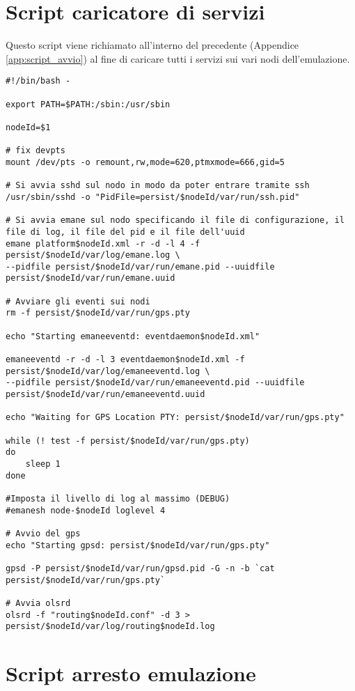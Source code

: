 \section{Script caricatore di servizi}
\label{app:script_richiamato}

Questo script viene richiamato all'interno del precedente (Appendice \ref{app:script_avvio}) al fine di caricare tutti i servizi sui vari nodi dell'emulazione. \\

\lstset{language=BASH}
\begin{lstlisting}
#!/bin/bash -

export PATH=$PATH:/sbin:/usr/sbin

nodeId=$1

# fix devpts
mount /dev/pts -o remount,rw,mode=620,ptmxmode=666,gid=5

# Si avvia sshd sul nodo in modo da poter entrare tramite ssh
/usr/sbin/sshd -o "PidFile=persist/$nodeId/var/run/ssh.pid"

# Si avvia emane sul nodo specificando il file di configurazione, il file di log, il file del pid e il file dell'uuid
emane platform$nodeId.xml -r -d -l 4 -f persist/$nodeId/var/log/emane.log \
--pidfile persist/$nodeId/var/run/emane.pid --uuidfile persist/$nodeId/var/run/emane.uuid      

# Avviare gli eventi sui nodi
rm -f persist/$nodeId/var/run/gps.pty

echo "Starting emaneeventd: eventdaemon$nodeId.xml"

emaneeventd -r -d -l 3 eventdaemon$nodeId.xml -f persist/$nodeId/var/log/emaneeventd.log \
--pidfile persist/$nodeId/var/run/emaneeventd.pid --uuidfile persist/$nodeId/var/run/emaneeventd.uuid

echo "Waiting for GPS Location PTY: persist/$nodeId/var/run/gps.pty"

while (! test -f persist/$nodeId/var/run/gps.pty)
do
	sleep 1
done

#Imposta il livello di log al massimo (DEBUG)
#emanesh node-$nodeId loglevel 4

# Avvio del gps
echo "Starting gpsd: persist/$nodeId/var/run/gps.pty"

gpsd -P persist/$nodeId/var/run/gpsd.pid -G -n -b `cat persist/$nodeId/var/run/gps.pty`

# Avvia olsrd
olsrd -f "routing$nodeId.conf" -d 3 > persist/$nodeId/var/log/routing$nodeId.log
\end{lstlisting}

\section{Script arresto emulazione}
\label{app:script_arresto}

